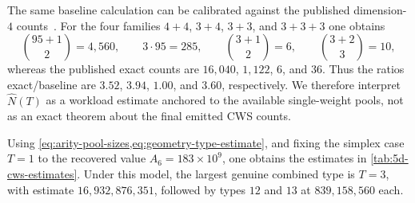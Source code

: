 The same baseline calculation can be calibrated against the published
dimension-$4$ counts~\cite{KreuzerSkarkeCYcsws}.  For the four families
$4{+}4$, $3{+}4$, $3{+}3$, and $3{+}3{+}3$ one obtains
\[
  \binom{95+1}{2} = 4{,}560,\qquad 3 \cdot 95 = 285,\qquad
  \binom{3+1}{2} = 6,\qquad \binom{3+2}{3} = 10,
\]
whereas the published exact counts are $16{,}040$, $1{,}122$, $6$, and
$36$.  Thus the ratios exact/baseline are $3.52$, $3.94$, $1.00$, and
$3.60$, respectively.  We therefore interpret $\widehat N(T)$ as a
workload estimate anchored to the available single-weight pools, not as an
exact theorem about the final emitted CWS counts.

Using \cref{eq:arity-pool-sizes,eq:geometry-type-estimate}, and fixing the
simplex case $T=1$ to the recovered value $A_6 = 183 \times 10^9$, one
obtains the estimates in \cref{tab:5d-cws-estimates}.  Under this model,
the largest genuine combined type is $T=3$, with estimate
$16{,}932{,}876{,}351$, followed by types $12$ and $13$ at
$839{,}158{,}560$ each.

